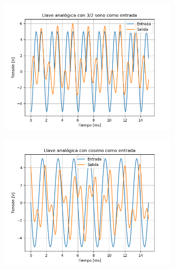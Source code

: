 \begin{figure}[H]
	\begin{subfigure}{.5\textwidth}
	\centering
	\includegraphics[width=\textwidth]{ImagenesEjercicio6/puntob1/LA - 3 2.png}
	\end{subfigure}	
	\begin{subfigure}{.5\textwidth}
	\centering
	\includegraphics[width=\textwidth]{ImagenesEjercicio6/puntob1/LA - Cos.png}
	\end{subfigure}
	

\end{figure}
